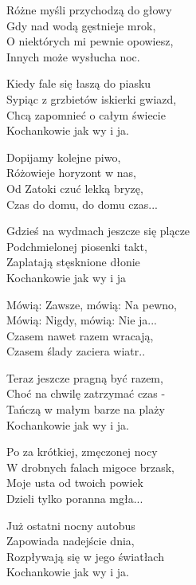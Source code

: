 \begin{text}
    Różne myśli przychodzą do głowy\\
    Gdy nad wodą gęstnieje mrok,\\
    O niektórych mi pewnie opowiesz,\\
    Innych może wysłucha noc.

    Kiedy fale się łaszą do piasku\\
    Sypiąc z grzbietów iskierki gwiazd,\\
    Chcą zapomnieć o całym świecie\\
    Kochankowie jak wy i ja.

    Dopijamy kolejne piwo,\\
    Różowieje horyzont w nas,\\
    Od Zatoki czuć lekką bryzę,\\
    Czas do domu, do domu czas...

    Gdzieś na wydmach jeszcze się plącze\\
    Podchmielonej piosenki takt,\\
    Zaplatają stęsknione dłonie\\
    Kochankowie jak wy i ja

    Mówią: Zawsze, mówią: Na pewno,\\
    Mówią: Nigdy, mówią: Nie ja...\\
    Czasem nawet razem wracają,\\
    Czasem ślady zaciera wiatr..

    Teraz jeszcze pragną być razem,\\
    Choć na chwilę zatrzymać czas -\\
    Tańczą w małym barze na plaży\\
    Kochankowie jak wy i ja.

    Po za krótkiej, zmęczonej nocy\\
    W drobnych falach migoce brzask,\\
    Moje usta od twoich powiek\\
    Dzieli tylko poranna mgła...

    Już ostatni nocny autobus\\
    Zapowiada nadejście dnia,\\
    Rozpływają się w jego światłach\\
    Kochankowie jak wy i ja.
\end{text}
